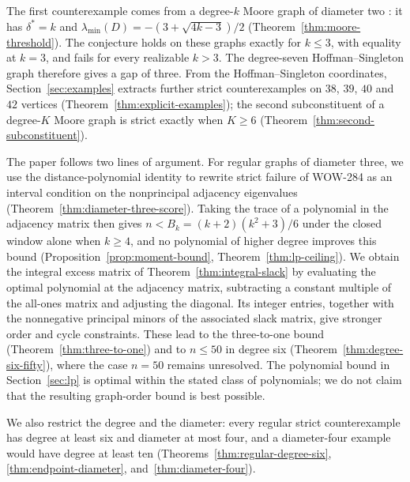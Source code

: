 \documentclass[a4paper,10pt,reqno]{amsart}
\theoremstyle{plain}
\theoremstyle{definition}
\theoremstyle{remark}
\begin{document}
The first counterexample comes from a degree-\(k\) Moore graph of diameter
two \cite{HoffmanSingleton1960}: it has \(\delta^*=k\) and
\(\lambda_{\min}(D)=-(3+\sqrt{4k-3})/2\)
(Theorem~\ref{thm:moore-threshold}).
The conjecture holds on these graphs exactly for \(k\le3\), with equality at
\(k=3\), and fails for every realizable \(k>3\).  The degree-seven
Hoffman--Singleton graph therefore gives a gap of three.
From the Hoffman--Singleton coordinates, Section~\ref{sec:examples}
extracts further strict counterexamples on \(38\), \(39\), \(40\) and \(42\)
vertices (Theorem~\ref{thm:explicit-examples}); the second subconstituent of
a degree-\(K\) Moore graph is strict exactly when \(K\ge6\)
(Theorem~\ref{thm:second-subconstituent}).

The paper follows two lines of argument. For regular graphs of diameter
three, we use the distance-polynomial identity to rewrite strict failure of
WOW-284 as an interval condition on the nonprincipal adjacency eigenvalues
(Theorem~\ref{thm:diameter-three-score}). Taking the trace of a polynomial
in the adjacency matrix then gives \(n<B_k=(k+2)(k^2+3)/6\) under the closed
window alone when \(k\ge4\), and no polynomial of higher degree improves this
bound (Proposition~\ref{prop:moment-bound}, Theorem~\ref{thm:lp-ceiling}).
We obtain the integral excess matrix of Theorem~\ref{thm:integral-slack} by
evaluating the optimal polynomial at the adjacency matrix, subtracting a
constant multiple of the all-ones matrix and adjusting the diagonal.
Its integer entries, together with the nonnegative principal minors of the
associated slack matrix, give stronger order and cycle constraints. These lead to the
three-to-one bound (Theorem~\ref{thm:three-to-one}) and to \(n\le50\) in
degree six (Theorem~\ref{thm:degree-six-fifty}), where the case \(n=50\)
remains unresolved. The polynomial bound in
Section~\ref{sec:lp} is optimal within the stated class of polynomials;
we do not claim that the resulting graph-order bound is best possible.

We also restrict the degree and the diameter: every regular strict
counterexample has degree at least six and diameter at most four, and a
diameter-four example would have degree at least ten
(Theorems~\ref{thm:regular-degree-six}, \ref{thm:endpoint-diameter},
and~\ref{thm:diameter-four}).
\end{document}
